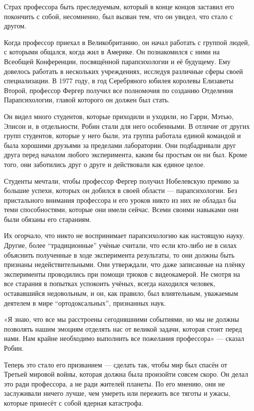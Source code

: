 \documentclass[a5paper, 9pt,
final, openany, twoside=true]{memoir}
\begin{document}
Страх профессора быть преследуемым, который в конце концов заставил его покончить с собой, несомненно, был вызван тем, что он увидел, что стало с другом.

Когда профессор приехал в Великобританию, он начал работать с группой людей, с которыми общался, когда жил в Америке. Он познакомился с ними на Всеобщей Конференции, посвящённой парапсихологии и её будущему. Ему довелось работать в нескольких учреждениях, исследуя различные сферы своей специализации. В 1977 году, в год Серебряного юбилея королевы Елизаветы Второй, профессор Фергер получил все полномочия по созданию Отделения Парапсихологии, главой которого он должен был стать.

Он видел много студентов, которые приходили и уходили, но Гарри, Мэтью, Элисон и, в отдельности, Робин стали для него особенными. В отличие от других групп студентов, которые у него были, эта группа работала единой командой и была хорошими друзьями за пределами лаборатории. Они подбадривали друг друга перед началом любого эксперимента, каким бы простым он ни был. Кроме того, они заботились друг о друге и действовали как единое целое.\bigskip

Студенты мечтали, чтобы профессор Фергер получил Нобелевскую премию за большие успехи, которых он добился в своей области — парапсихологии. Без пристального внимания профессора и его уроков никто из них не обладал бы теми способностями, которые они имели сейчас. Всеми своими навыками они были обязаны его стараниям.

Их огорчало, что никто не воспринимает парапсихологию как настоящую науку. Другие, более ``традиционные'' учёные считали, что если кто-либо не в силах объяснить полученные в ходе эксперимента результаты, то они должны быть признаны недействительными. Они утверждали, что даже записанные на плёнку эксперименты проводились при помощи трюков с видеокамерой. Не смотря на все старания в попытках успокоить учёных, всегда находился человек, остававшийся недовольным, и он, как правило, был влиятельным, уважаемым деятелем в мире ``ортодоксальных'', признанных наук.\bigskip

«Я знаю, что все мы расстроены сегодняшними событиями, но мы не должны позволять нашим эмоциям отделять нас от великой задачи, которая стоит перед нами. Нам крайне необходимо выполнить все пожелания профессора» — сказал Робин.

Теперь это стало его призванием — сделать так, чтобы мир был спасён от Третьей мировой войны, которая должна была произойти совсем скоро. Он делал это ради профессора, а не ради жителей планеты. По его мнению, они не заслуживали ничего лучше, чем умереть или пережить все тяготы и ужасы, которые принесёт с собой ядерная катастрофа.\bigskip
\end{document}
